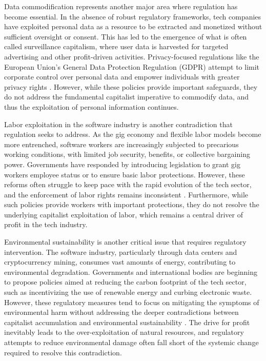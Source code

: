 Data commodification represents another major area where regulation has become essential. In the absence of robust regulatory frameworks, tech companies have exploited personal data as a resource to be extracted and monetized without sufficient oversight or consent. This has led to the emergence of what is often called surveillance capitalism, where user data is harvested for targeted advertising and other profit-driven activities. Privacy-focused regulations like the European Union’s General Data Protection Regulation (GDPR) attempt to limit corporate control over personal data and empower individuals with greater privacy rights \cite[pp.~111-113]{zuboff2020}. However, while these policies provide important safeguards, they do not address the fundamental capitalist imperative to commodify data, and thus the exploitation of personal information continues.

Labor exploitation in the software industry is another contradiction that regulation seeks to address. As the gig economy and flexible labor models become more entrenched, software workers are increasingly subjected to precarious working conditions, with limited job security, benefits, or collective bargaining power. Governments have responded by introducing legislation to grant gig workers employee status or to ensure basic labor protections. However, these reforms often struggle to keep pace with the rapid evolution of the tech sector, and the enforcement of labor rights remains inconsistent \cite[pp.~145-148]{scholz2017}. Furthermore, while such policies provide workers with important protections, they do not resolve the underlying capitalist exploitation of labor, which remains a central driver of profit in the tech industry.

Environmental sustainability is another critical issue that requires regulatory intervention. The software industry, particularly through data centers and cryptocurrency mining, consumes vast amounts of energy, contributing to environmental degradation. Governments and international bodies are beginning to propose policies aimed at reducing the carbon footprint of the tech sector, such as incentivizing the use of renewable energy and curbing electronic waste. However, these regulatory measures tend to focus on mitigating the symptoms of environmental harm without addressing the deeper contradictions between capitalist accumulation and environmental sustainability \cite[pp.~203-205]{maxwell2012}. The drive for profit inevitably leads to the over-exploitation of natural resources, and regulatory attempts to reduce environmental damage often fall short of the systemic change required to resolve this contradiction.

